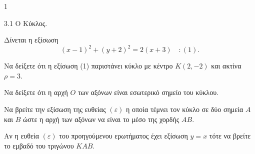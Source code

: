 \begin{ylh}{1}
    \item 3.1 Ο Κύκλος.
\end{ylh}
Δίνεται η εξίσωση
\[ (x-1)^2+(y+2)^2=2(x+3) \quad : (1). \]
\begin{alist}
\item Να δείξετε ότι η εξίσωση (1) παριστάνει κύκλο με κέντρο $K(2,-2)$ και ακτίνα $\rho=3$. 
\item Να δείξετε ότι η αρχή $O$ των αξόνων είναι εσωτερικό σημείο του κύκλου. 
\item Να βρείτε την εξίσωση της ευθείας $(\varepsilon)$ η οποία τέμνει τον κύκλο σε δύο σημεία $A$ και $B$ ώστε η αρχή των αξόνων να είναι το μέσο της χορδής $AB$. 
\item Αν η ευθεία $(\varepsilon)$ του προηγούμενου ερωτήματος έχει εξίσωση $y=x$ τότε να βρείτε το εμβαδό του τριγώνου $KAB$. 
\end{alist}
